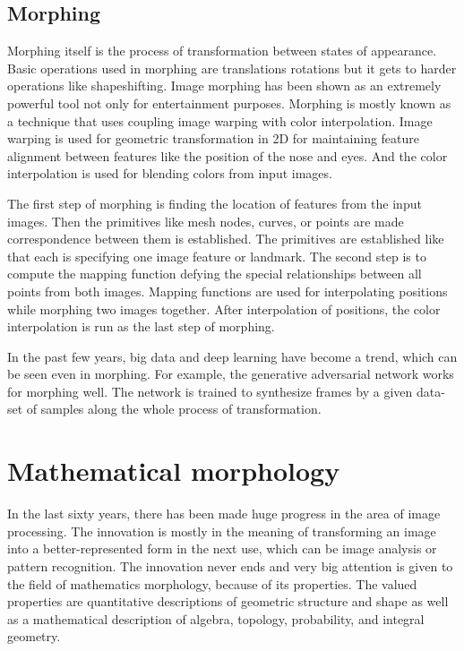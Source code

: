 \subsection{Morphing}
Morphing itself is the process of transformation between states of appearance. Basic operations used in morphing are translations rotations but it gets to harder operations like shapeshifting. \cite{morphing3} Image morphing has been shown as an extremely powerful tool not only for entertainment purposes. Morphing is mostly known as a technique that uses coupling image warping with color interpolation. Image warping is used for geometric transformation in 2D for maintaining feature alignment between features like the position of the nose and eyes. And the color interpolation is used for blending colors from input images.\cite{morphing2}\cite{morphing1}

The first step of morphing is finding the location of features from the input images. Then the primitives like mesh nodes, curves, or points are made correspondence between them is established. The primitives are established like that each is specifying one image feature or landmark. The second step is to compute the mapping function defying the special relationships between all points from both images. Mapping functions are used for interpolating positions while morphing two images together. After interpolation of positions, the color interpolation is run as the last step of morphing. \cite{morphing1}

In the past few years, big data and deep learning have become a trend, which can be seen even in morphing. For example, the generative adversarial network works for morphing well. The network is trained to synthesize frames by a given data-set of samples along the whole process of transformation. \cite{morphing3}

\section{Mathematical morphology}
In the last sixty years, there has been made huge progress in the area of image processing. The innovation is mostly in the meaning of transforming an image into a better-represented form in the next use, which can be image analysis or pattern recognition. The innovation never ends and very big attention is given to the field of mathematics morphology, because of its properties. The valued properties are quantitative descriptions of geometric structure and shape as well as a mathematical description of algebra, topology, probability, and integral geometry.\cite{shih2009image}

